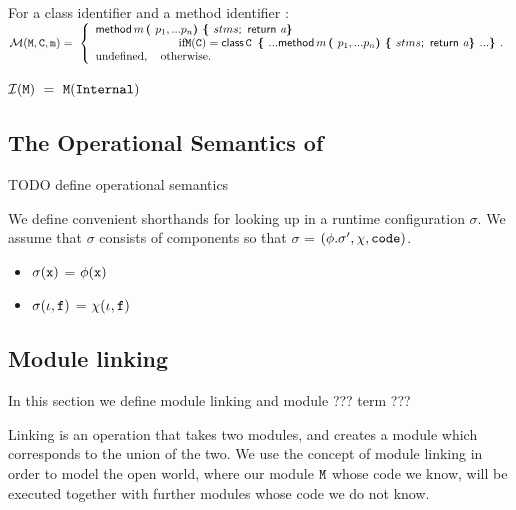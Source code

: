   
 \begin{definition}[Lookup]For a class identifier   and a method identifier  : $ ~ $ \\

\noindent
$
{\mathcal M}({\mbox{\tt{M}}}{},{\mbox{\tt{{\mbox{\tt{C}}}}}}, {\mbox{\tt{m}}})      =  \ \left\{  
\begin{array}{l}
                          {\bf{\sf {method}}}\, m\, \mbox{\tt{\bf{( }}} p_1, ... p_n \mbox{\tt{\bf{) }}} \mbox{\tt{\bf{\{ }}} stms \mbox{{{\bf{\sf {;}}}}\ }\, {\bf{\sf {return}}}\ {{\mbox{\tt{{\it a}}}}} \mbox{\tt{\bf{\} }}}\\
\hspace{1in} \mbox{if}  {\mbox{\tt{M}}}({\mbox{\tt{C}}}) =   
{\bf{\sf {class}}}\, {\mbox{\tt{C}}}\, \  \mbox{\tt{\bf{\{ }}} ...   {\bf{\sf {method}}}\, m\, \mbox{\tt{\bf{( }}} p_1, ... p_n \mbox{\tt{\bf{) }}} \mbox{\tt{\bf{\{ }}} stms \mbox{{{\bf{\sf {;}}}}\ }\, {\bf{\sf {return}}}\ {{\mbox{\tt{{\it a}}}}} \mbox{\tt{\bf{\} }}}  ... \mbox{\tt{\bf{\} }}}.  
\\
\mbox{undefined},  \ \ \ \mbox{otherwise.}
\end{array}
                    \right.$
 
${\mathcal{ I}} ( {{\mbox{\tt{M}}}} ) \    =  \     {\mbox{\tt{M}}}({\mbox{\tt{Internal}}} )$
  \end{definition}

\subsection{The Operational Semantics of \LangOO}
\label{formal:semantics}

TODO define operational semantics

\begin{definition}
We define convenient shorthands for looking up in a runtime configuration $\sigma$. We assume that
$\sigma$ consists of components so that $\sigma$ = $(\phi.\sigma', \chi, {\mbox{\tt{code}}} )$.
\begin{itemize}
\item 
$\sigma({\mbox{\tt{x}}})$ = $\phi({\mbox{\tt{x}}})$ 
\item
$\sigma(\iota, {\mbox{\tt{f}}})$ = $\chi(\iota,{\mbox{\tt{f}}})$ 
\end{itemize}

\end{definition}

\subsection{Module linking}

 In this section we define  module linking and module ??? term ???
 
 Linking is an operation that takes two modules, and creates a module which corresponds  to the union of the two. We use the concept of module linking in order to model the open world, where our module ${\mbox{\tt{M}}}$ whose code we know, will be executed together with further modules whose code we do not know. 


